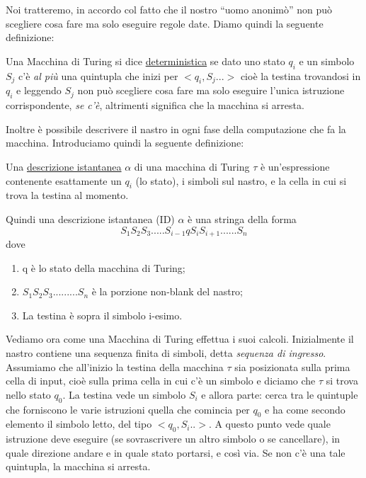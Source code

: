 Noi tratteremo, in accordo col fatto che il nostro ``uomo anonim\`o''
non pu\`o scegliere cosa fare ma solo eseguire regole date. Diamo
quindi la seguente definizione:

\begin{definizione}
Una Macchina di Turing si dice \underline{deterministica} se dato uno
stato $q_{i}$ e un simbolo $S_{j}$ c'\`e \textsl{al pi\`u} una
quintupla che inizi per $<q_{i},S_{j}...>$ cio\`e la testina
trovandosi in $q_{i}$ e leggendo $S_{j}$ non pu\`o scegliere cosa fare
ma solo eseguire l'unica istruzione corrispondente, \textsl{se c'\`e},
altrimenti significa che la macchina si arresta.
\end{definizione}

Inoltre \`e possibile descrivere il nastro in ogni fase della
computazione che fa la macchina. Introduciamo quindi la seguente
definizione:

\begin{definizione}
Una \underline{descrizione istantanea} $\alpha$ di una macchina di
Turing $\tau$ \`e un'espressione contenente esattamente un $q_{i}$ (lo
stato), i simboli sul nastro, e la cella in cui si trova la testina al
momento.
\end{definizione}

Quindi una descrizione istantanea (ID) $\alpha$ \`e una stringa della
forma $$S_1S_2S_3.....S_{i-1}qS_{i}S_{i+1}......S_{n}$$ dove

\begin{enumerate}
\item q \`e lo stato della macchina di Turing;
\item $S_1S_2S_3.........S_{n}$ \`e la porzione non-blank del nastro;
\item La testina \`e sopra il simbolo i-esimo.
\end{enumerate}
\vspace{0.5cm}

Vediamo ora come una Macchina di Turing effettua i suoi
calcoli. Inizialmente il nastro contiene una sequenza finita di
simboli, detta \textsl{sequenza di ingresso}. Assumiamo che all'inizio
la testina della macchina $\tau$ sia posizionata sulla prima cella di
input, cio\`e sulla prima cella in cui c'\`e un simbolo e diciamo che
$\tau$ si trova nello stato $q_0$. La testina vede un simbolo $S_i$ e
allora parte: cerca tra le quintuple che forniscono le varie
istruzioni quella che comincia per $q_0$ e ha come secondo elemento il
simbolo letto, del tipo $<q_0,S_i..>$. A questo punto vede quale
istruzione deve eseguire (se sovrascrivere un altro simbolo o se
cancellare), in quale direzione andare e in quale stato portarsi, e
cos\`i via. Se non c'\`e una tale quintupla, la macchina si arresta.

